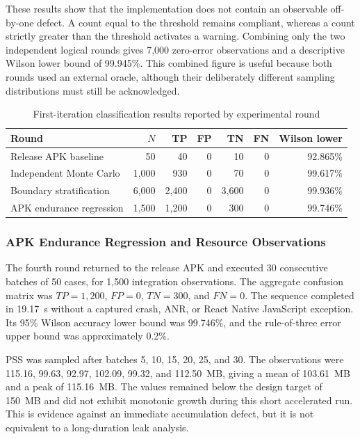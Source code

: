 These results show that the implementation does not contain an observable off-by-one defect. A count equal to the threshold remains compliant, whereas a count strictly greater than the threshold activates a warning. Combining only the two independent logical rounds gives 7,000 zero-error observations and a descriptive Wilson lower bound of 99.945\%. This combined figure is useful because both rounds used an external oracle, although their deliberately different sampling distributions must still be acknowledged.

\begin{table}[H]
\centering
\caption{First-iteration classification results reported by experimental round}
\label{tab:ch5-first-iteration}
\small
\begin{tabular}{lrrrrrr}
\toprule
\textbf{Round} & \textbf{\(N\)} & \textbf{TP} & \textbf{FP} & \textbf{TN} & \textbf{FN} & \textbf{Wilson lower} \\
\midrule
Release APK baseline & 50 & 40 & 0 & 10 & 0 & 92.865\% \\
Independent Monte Carlo & 1,000 & 930 & 0 & 70 & 0 & 99.617\% \\
Boundary stratification & 6,000 & 2,400 & 0 & 3,600 & 0 & 99.936\% \\
APK endurance regression & 1,500 & 1,200 & 0 & 300 & 0 & 99.746\% \\
\bottomrule
\end{tabular}
\end{table}

\subsubsection{APK Endurance Regression and Resource Observations}

The fourth round returned to the release APK and executed 30 consecutive batches of 50 cases, for 1,500 integration observations. The aggregate confusion matrix was \(TP=1,200\), \(FP=0\), \(TN=300\), and \(FN=0\). The sequence completed in 19.17~s without a captured crash, ANR, or React Native JavaScript exception. Its 95\% Wilson accuracy lower bound was 99.746\%, and the rule-of-three error upper bound was approximately 0.2\%.

PSS was sampled after batches 5, 10, 15, 20, 25, and 30. The observations were 115.16, 99.63, 92.97, 102.09, 99.32, and 112.50~MB, giving a mean of 103.61~MB and a peak of 115.16~MB. The values remained below the design target of 150~MB and did not exhibit monotonic growth during this short accelerated run. This is evidence against an immediate accumulation defect, but it is not equivalent to a long-duration leak analysis.

